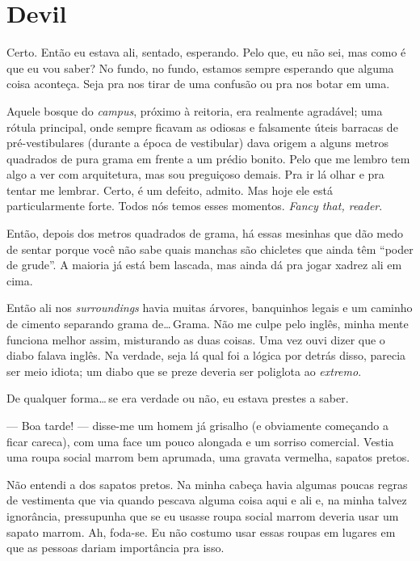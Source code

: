 \chapter{Devil}

Certo. Então eu estava ali, sentado, esperando. Pelo que, eu não sei, mas como é que eu vou saber? No fundo, no fundo, estamos sempre esperando que alguma coisa aconteça. Seja pra nos tirar de uma confusão ou pra nos botar em uma.

Aquele bosque do \emph{campus}, próximo à reitoria, era realmente agradável; uma rótula principal, onde sempre ficavam as odiosas e falsamente úteis barracas de pré-vestibulares (durante a época de vestibular) dava origem a alguns metros quadrados de pura grama em frente a um prédio bonito. Pelo que me lembro tem algo a ver com arquitetura, mas sou preguiçoso demais. Pra ir lá olhar e pra tentar me lembrar. Certo, é um defeito, admito. Mas hoje ele está particularmente forte. Todos nós temos esses momentos. \foreignlanguage{english}{\emph{Fancy that, reader}}.

Então, depois dos metros quadrados de grama, há essas mesinhas que dão medo de sentar porque você não sabe quais manchas são chicletes que ainda têm ``poder de grude''. A maioria já está bem lascada, mas ainda dá pra jogar xadrez ali em cima.

Então ali nos \emph{surroundings} havia muitas árvores, banquinhos legais e um caminho de cimento separando grama de\ldots\,Grama. Não me culpe pelo inglês, minha mente funciona melhor assim, misturando as duas coisas. Uma vez ouvi dizer que o diabo falava inglês. Na verdade, seja lá qual foi a lógica por detrás disso, parecia ser meio idiota; um diabo que se preze deveria ser poliglota ao \emph{extremo}.

De qualquer forma\ldots\,se era verdade ou não, eu estava prestes a saber.

--- Boa tarde! --- disse-me um homem já grisalho (e obviamente começando a ficar careca), com uma face um pouco alongada e um sorriso comercial. Vestia uma roupa social marrom bem aprumada, uma gravata vermelha, sapatos pretos.

Não entendi a dos sapatos pretos. Na minha cabeça havia algumas poucas regras de vestimenta que via quando pescava alguma coisa aqui e ali e, na minha talvez ignorância, pressupunha que se eu usasse roupa social marrom deveria usar um sapato marrom. Ah, foda-se. Eu não costumo usar essas roupas em lugares em que as pessoas dariam importância pra isso.

